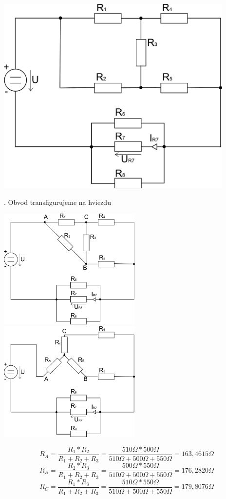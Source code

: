 \documentclass[a4paper,12pt]{article}
\begin{document}
\includegraphics[height=10cm]{img/pr1a}

. Obvod transfigurujeme na hviezdu

\includegraphics[height=6cm]{img/pr1b}
\includegraphics[height=6cm]{img/pr1c}

\bigskip
\begin{equation*}
R_A = \frac{R_1 * R_2}{ R_1 + R_2 + R_3} = \frac{510\Omega*500\Omega}{510\Omega+500\Omega+550\Omega} = 163,4615\Omega
\end{equation*}
\begin{equation*}
R_B = \frac{R_2 * R_3}{ R_1 + R_2 + R_3} = \frac{500\Omega*550\Omega}{510\Omega+500\Omega+550\Omega} = 176,2820\Omega
\end{equation*}
\begin{equation*}
R_C = \frac{R_1 * R_3}{ R_1 + R_2 + R_3} = \frac{510\Omega*550\Omega}{510\Omega+500\Omega+550\Omega} = 179,8076\Omega
\end{equation*}
\end{document}
